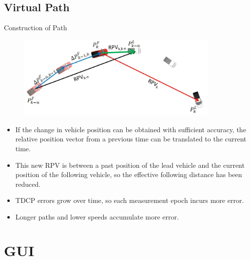 \documentclass{beamer}
\begin{document}
  \subsection{Virtual Path}

    \begin{frame}{Construction of Path}
      \begin{figure}
        \includegraphics[width=10cm]{../graphics/path_algorithm.png}
      \end{figure}
      \begin{itemize} \footnotesize
        \item If the change in vehicle position can be obtained with sufficient accuracy, the relative position vector from a previous time can be translated to the current time.
        \item This new RPV is between a past position of the lead vehicle and the current position of the following vehicle, so the effective following distance has been reduced.
        \item TDCP errors grow over time, so each measurement epoch incurs more error.
        \item Longer paths and lower speeds accumulate more error.
      \end{itemize}
    \end{frame}



\section{GUI}
\end{document}
